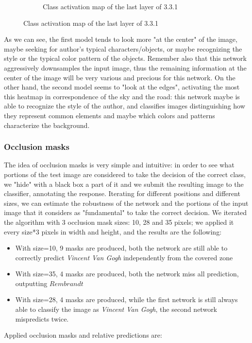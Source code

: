 \begin{figure}[H]
\begin{subfigure}{0.5\textwidth}
		\caption{Class activation map of the last layer of 3.3.1}
		\label{fig:il_heatmap}
	\end{subfigure}
\end{figure}

\noindent As we can see, the first model tends to look more "at the center" of the image, maybe seeking for author's typical characters/objects, or maybe recognizing the style or the typical color pattern of the objects. Remember also that this network aggressively downsamples the input image, thus the remaining information at the center of the image will be very various and precious for this network. On the other hand, the second model seems to "look at the edges", activating the most this heatmap in correspondence of the sky and the road: this network maybe is able to recognize the style of the author, and classifies images distinguishing how they represent common elements and maybe which colors and patterns characterize the background.

\subsubsection{Occlusion masks}
The idea of occlusion masks is very simple and intuitive: in order to see what portions of the test image are considered to take the decision of the correct class, we "hide" with a black box a part of it and we submit the resulting image to the classifier, annotating the response. Iterating for different positions and different sizes, we can estimate the robustness of the network and the portions of the input image that it considers as "fundamental" to take the correct decision.
We iterated the algorithm with 3 occlusion mask sizes: 10, 28 and 35 pixels; we applied it every size*3 pixels in width and height, and the results are the following:
\begin{itemize}
\item With size=10, 9 masks are produced, both the network are still able to correctly predict \textit{Vincent Van Gogh} independently from the covered zone
\item With size=35, 4 masks are produced, both the network miss all prediction, outputting $Rembrandt$
\item With size=28, 4 masks are produced, while the first network is still always able to classify the image as \textit{Vincent Van Gogh}, the second network mispredicts twice.
\end{itemize}

\noindent Applied occlusion masks and relative predictions are:

